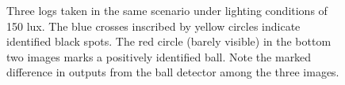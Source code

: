 \documentclass[11pt, twocolumn]{article}
\begin{document}
\begin{figure}[h]
\caption{Three logs taken in the same scenario under lighting conditions of 150 lux. The blue crosses inscribed by yellow circles indicate identified black spots. The red circle (barely visible) in the bottom two images marks a positively identified ball. Note the marked difference in outputs from the ball detector among the three images.}
\end{figure}
\pagebreak
{}
\end{document}
